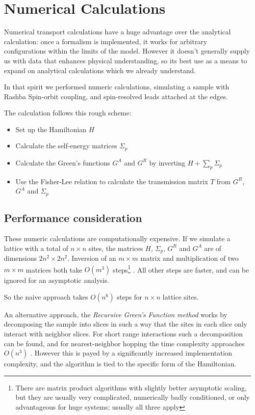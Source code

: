 \chapter{Numerical Calculations}

Numerical transport calculations have a huge advantage over the analytical
calculation: once a formalism is implemented, it works for arbitrary
configurations within the limits of the model. However it doesn't generally
supply us with data that enhances physical understanding, so its best use as a
means to expand on analytical calculations which we already understand.

In that spirit we performed numeric calculations, simulating a sample with
Rashba Spin-orbit coupling, and spin-resolved leads attached at the edges.

The calculation follows this rough scheme:

\begin{itemize}
    \item Set up the Hamiltonian $H$
    \item Calculate the self-energy matrices $\Sigma_p$
    \item Calculate the Green's functions $G^A$ and $G^R$ by inverting
          $H + \sum_p \Sigma_p$
    \item Use the Fisher-Lee relation to calculate the transmission matrix $T$
            from $G^R$, $G^A$ and $\Sigma_p$
\end{itemize}

\section{Performance consideration}

These numeric calculations are computationally expensive. If we simulate a
lattice with a total of $n \times n$ sites, the matrices $H$, $\Sigma_p$, $G^R$ and
$G^A$ are of dimensions $2n^2 \times 2n^2$. Inversion of an $m \times m $
matrix and multiplication of two $ m \times m $ matrices both take $O(m^3)$
steps\footnote{There are matrix product algorithms with slightly better
asymptotic scaling, but they are usually very complicated, numerically badly
conditioned, or only advantageous for huge systems; usually all three apply}
\cite{matrixperformance}. All other steps are faster, and can be ignored for
an asymptotic analysis.

So the naive approach takes $O(n^6)$ steps for $n \times n$ lattice sites.

An alternative approach, the \emph{Recursive Green's Function method} works by
decomposing the sample into slices in such a way that the sites in each slice
only interact with neighbor slices. For short range interactions such a
decomposition can be found, and for nearest-neighbor hopping the time
complexity approaches $O(n^3)$ \cite{rgfschmelcher}. However this is payed by
a significantly increased implementation complexity, and the algorithm is tied
to the specific form of the Hamiltonian.

